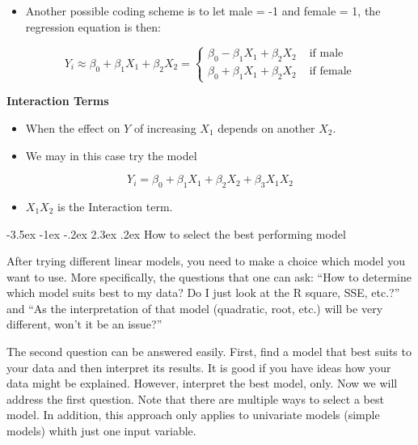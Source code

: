 \documentclass[]{book}
\makeatletter
\providecommand{\tightlist}{%
  \setlength{\itemsep}{0pt}\setlength{\parskip}{0pt}}
\renewcommand\section{\@startsection {section}{1}{\z@}%
                                   {-3.5ex \@plus -1ex \@minus -.2ex}%
                                   {2.3ex \@plus.2ex}%
                                   {\normalfont\Large\bfseries\color{ForestGreen}}}
\theoremstyle{definition}
\theoremstyle{definition}
\theoremstyle{definition}
\theoremstyle{remark}
\makeatother
\begin{document}
\begin{itemize}
\tightlist
\item
  Another possible coding scheme is to let male = -1 and female = 1, the
  regression equation is then:
\end{itemize}

\[ Y_i \approx \beta_0 + \beta_1 X_1 + \beta_2 X_2 = \begin{cases}
  \beta_0 -\beta_1 X_1 + \beta_2 X_2 & \text{ if male} \\
  \beta_0 + \beta_1 X_1 + \beta_2 X_2 & \text{ if female}
\end{cases} \]

\textbf{Interaction Terms}

\begin{itemize}
\tightlist
\item
  When the effect on \(Y\) of increasing \(X_1\) depends on another
  \(X_2\).
\item
  We may in this case try the model
\end{itemize}

\[ Y_i = \beta_0 + \beta_1 X_1 + \beta_2 X_2 + \beta_3 X_1 X_2 \]

\begin{itemize}
\tightlist
\item
  \(X_1 X_2\) is the Interaction term.
\end{itemize}

\section{How to select the best performing
model}\label{how-to-select-the-best-performing-model}

After trying different linear models, you need to make a choice which
model you want to use. More specifically, the questions that one can
ask: ``How to determine which model suits best to my data? Do I just
look at the R square, SSE, etc.?'' and ``As the interpretation of that
model (quadratic, root, etc.) will be very different, won't it be an
issue?''

The second question can be answered easily. First, find a model that
best suits to your data and then interpret its results. It is good if
you have ideas how your data might be explained. However, interpret the
best model, only. Now we will address the first question. Note that
there are multiple ways to select a best model. In addition, this
approach only applies to univariate models (simple models) whith just
one input variable.
\end{document}
